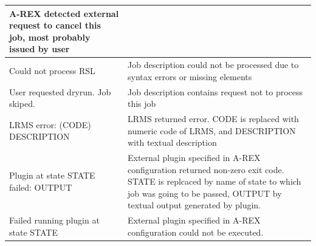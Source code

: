 \documentclass{article}                            %
\begin{document}
\begin{longtable}{|p{5cm}|p{10cm}|}
A-REX detected external request to cancel this job, most probably
issued by user\tabularnewline
\hline
Could not process RSL&
Job description could not be processed due to syntax errors or missing
elements\tabularnewline
\hline
User requested dryrun. Job skiped.&
Job description contains request not to process this job\tabularnewline
\hline
LRMS error: (CODE) DESCRIPTION&
LRMS returned error. CODE is replaced with numeric code of LRMS, and
DESCRIPTION with textual description\tabularnewline
\hline
Plugin at state STATE failed: OUTPUT&
External plugin specified in A-REX configuration returned non-zero
exit code. STATE is replcaced by name of state to which job was going
to be passed, OUTPUT by textual output generated by plugin.\tabularnewline
\hline
Failed running plugin at state STATE&
External plugin specified in A-REX configuration could not be executed.\tabularnewline
\hline
\end{longtable}
\end{document}
